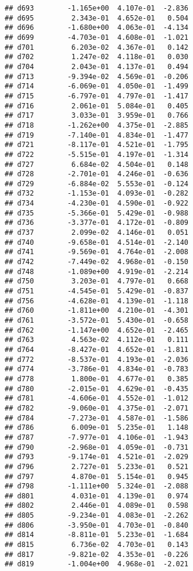 \documentclass[
]{article}
\begin{document}
\begin{verbatim}
## d693        -1.165e+00  4.107e-01  -2.836
## d695         2.343e-01  4.652e-01   0.504
## d696        -1.680e+00  4.063e-01  -4.134
## d699        -4.703e-01  4.608e-01  -1.021
## d701         6.203e-02  4.367e-01   0.142
## d702         1.247e-02  4.118e-01   0.030
## d704         2.043e-01  4.137e-01   0.494
## d713        -9.394e-02  4.569e-01  -0.206
## d714        -6.069e-01  4.050e-01  -1.499
## d715        -6.797e-01  4.797e-01  -1.417
## d716         2.061e-01  5.084e-01   0.405
## d717         3.033e-01  3.959e-01   0.766
## d718        -1.262e+00  4.375e-01  -2.885
## d719        -7.140e-01  4.834e-01  -1.477
## d721        -8.117e-01  4.521e-01  -1.795
## d722        -5.515e-01  4.197e-01  -1.314
## d727         6.684e-02  4.504e-01   0.148
## d728        -2.701e-01  4.246e-01  -0.636
## d729        -6.884e-02  5.553e-01  -0.124
## d732        -1.153e-01  4.093e-01  -0.282
## d734        -4.230e-01  4.590e-01  -0.922
## d735        -5.366e-01  5.429e-01  -0.988
## d736        -3.377e-01  4.172e-01  -0.809
## d737         2.099e-02  4.146e-01   0.051
## d740        -9.658e-01  4.514e-01  -2.140
## d741        -9.569e-01  4.764e-01  -2.008
## d742        -7.449e-02  4.968e-01  -0.150
## d748        -1.089e+00  4.919e-01  -2.214
## d750         3.203e-01  4.797e-01   0.668
## d751        -4.545e-01  5.429e-01  -0.837
## d756        -4.628e-01  4.139e-01  -1.118
## d760        -1.811e+00  4.210e-01  -4.301
## d761        -3.572e-01  5.430e-01  -0.658
## d762        -1.147e+00  4.652e-01  -2.465
## d763         4.563e-02  4.112e-01   0.111
## d764        -8.427e-01  4.652e-01  -1.811
## d772        -8.537e-01  4.193e-01  -2.036
## d774        -3.786e-01  4.834e-01  -0.783
## d778         1.800e-01  4.677e-01   0.385
## d780        -2.015e-01  4.629e-01  -0.435
## d781        -4.606e-01  4.552e-01  -1.012
## d782        -9.060e-01  4.375e-01  -2.071
## d784        -7.273e-01  4.587e-01  -1.586
## d786         6.009e-01  5.235e-01   1.148
## d787        -7.977e-01  4.106e-01  -1.943
## d790        -2.968e-01  4.059e-01  -0.731
## d793        -9.174e-01  4.521e-01  -2.029
## d796         2.727e-01  5.233e-01   0.521
## d797         4.870e-01  5.154e-01   0.945
## d798        -1.111e+00  5.324e-01  -2.088
## d801         4.031e-01  4.139e-01   0.974
## d802         2.446e-01  4.089e-01   0.598
## d805        -9.234e-01  4.083e-01  -2.262
## d806        -3.950e-01  4.703e-01  -0.840
## d814        -8.811e-01  5.233e-01  -1.684
## d815         6.736e-02  4.703e-01   0.143
## d817        -9.821e-02  4.353e-01  -0.226
## d819        -1.004e+00  4.968e-01  -2.021

\end{verbatim}
\end{document}
